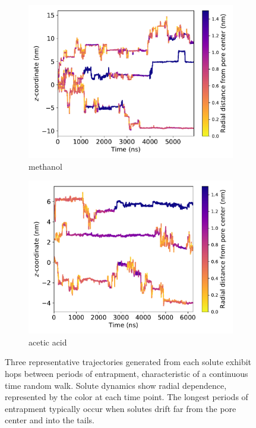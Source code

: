 \documentclass[journal=jctcce,manuscript=article]{achemso}
\begin{document}
\begin{figure}
\begin{subfigure}{0.45\textwidth}
  \includegraphics[width=\textwidth]{MET_trajectories.pdf}
  \caption{methanol}\label{fig:MET_trajectories}
  \end{subfigure}
  \begin{subfigure}{0.45\textwidth}
  \includegraphics[width=\textwidth]{ACH_trajectories.pdf}
  \caption{acetic acid}\label{fig:ACH_trajectories}
  \end{subfigure}
  \caption{Three representative trajectories generated from each solute exhibit hops
	  between periods of entrapment, characteristic of a continuous time random
	  walk. Solute dynamics show radial dependence, represented by the color at 
	  each time point. The longest periods of entrapment typically occur when
	  solutes drift far from the pore center and into the tails.
  }\label{fig:solute_trajectories}
  \end{figure}
  
\end{document}
